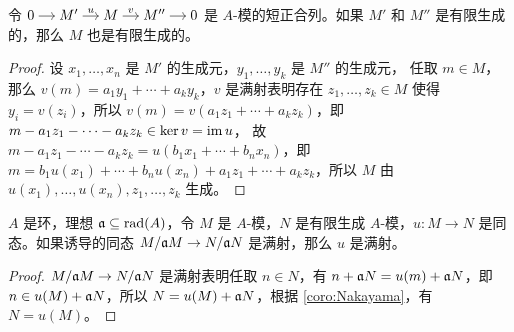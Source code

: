 \begin{problem}
  令 
  $
    \begin{tikzcd}[cramped,column sep=small]
      0\arrow[r] & M'\arrow[r,"u"] & M\arrow[r,"v"] & M''\arrow[r] & 0
    \end{tikzcd}
  $
  是 $A$-模的短正合列。如果 $M'$ 和 $M''$ 是有限生成的，那么 $M$ 也是有限生成的。
\end{problem}
\begin{proof}
  设 $x_1,\dots,x_n$ 是 $M'$ 的生成元，$y_1,\dots,y_k$ 是 $M''$ 的生成元，
  任取 $m\in M$，那么 $v(m)=a_1y_1+\cdots+a_ky_k$，$v$ 是满射表明存在
  $z_1,\dots,z_k\in M$ 使得 $y_i=v(z_i)$，所以
  $v(m)=v(a_1z_1+\cdots+a_kz_k)$，即 $m-a_1z_1-\cdots-a_kz_k\in\ker v=\operatorname{im} u$，
  故 $m-a_1z_1-\cdots-a_kz_k=u(b_1x_1+\cdots+b_nx_n)$，即
  $m=b_1u(x_1)+\cdots+b_nu(x_n)+a_1z_1+\cdots+a_kz_k$，所以
  $M$ 由 $u(x_1),\dots,u(x_n),z_1,\dots,z_k$ 生成。
\end{proof}

\begin{problem}
  $A$ 是环，理想 $\mathfrak{a}\subseteq\operatorname{rad}(A)$，令 $M$ 是 $A$-模，$N$ 是有限生成
  $A$-模，$u:M\to N$ 是同态。如果诱导的同态 $M/\mathfrak{a}M\to N/\mathfrak{a}N$
  是满射，那么 $u$ 是满射。
\end{problem}
\begin{proof}
  $M/\mathfrak{a}M\to N/\mathfrak{a}N$ 是满射表明任取 $n\in N$，有
  $n+\mathfrak{a}N=u(m)+\mathfrak{a}N$，即 $n\in u(M)+\mathfrak{a}N$，所以
  $N=u(M)+\mathfrak{a}N$，根据 \ref{coro:Nakayama}，有 $N=u(M)$。
\end{proof}


